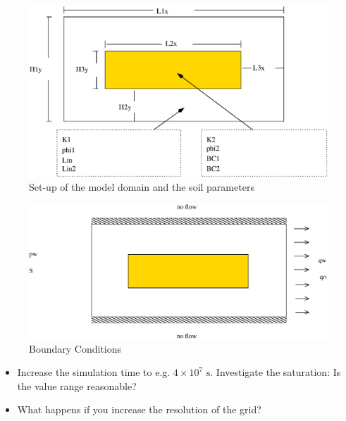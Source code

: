 \begin{figure}[ht]
\centering
\includegraphics[width=0.8\linewidth,keepaspectratio]{EPS/Ex2_Domain.eps}
\caption{Set-up of the model domain and the soil parameters}\label{tutorial-coupled:ex2_Domain}
\end{figure}

\begin{figure}[ht]
\centering
\includegraphics[width=0.8\linewidth,keepaspectratio]{EPS/Ex2_Boundary.eps}
\caption{Boundary Conditions}\label{tutorial-coupled:ex2_BC}
\end{figure}

\begin{itemize}
 \item Increase the simulation time to e.g. $4\times 10^7 \text{ s}$. Investigate the saturation: Is the value range reasonable?
 \item What happens if you increase the resolution of the grid?
\end{itemize}

